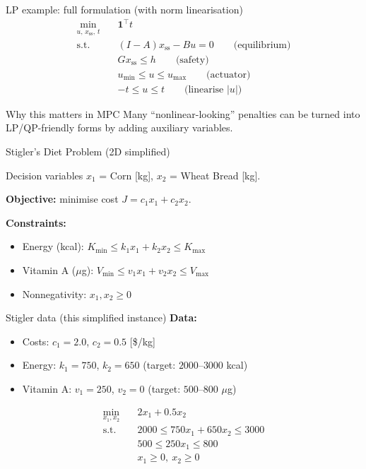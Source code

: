 \documentclass[aspectratio=169,10pt]{beamer}
\begin{document}
\begin{frame}{LP example: full formulation (with norm linearisation)}
\begin{equation*}
\begin{aligned}
\min_{u,\,x_{\mathrm{ss}},\,t}\quad & \mathbf{1}^\top t\\
\text{s.t.}\quad
&(I-A)x_{\mathrm{ss}}-Bu=0 \qquad \text{(equilibrium)}\\
&Gx_{\mathrm{ss}}\le h \qquad \text{(safety)}\\
&u_{\min}\le u\le u_{\max} \qquad \text{(actuator)}\\
&-t\le u\le t \qquad \text{(linearise }|u|\text{)}
\end{aligned}
\end{equation*}

\begin{notebox}{Why this matters in MPC}
Many ``nonlinear-looking'' penalties can be turned into LP/QP-friendly forms by adding auxiliary variables.
\end{notebox}
\end{frame}

\begin{frame}{Stigler's Diet Problem (2D simplified)}
\begin{examplebox}{Decision variables}
$x_1$ = Corn [kg], $x_2$ = Wheat Bread [kg].
\end{examplebox}

\textbf{Objective:} minimise cost $J=c_1x_1+c_2x_2$.

\textbf{Constraints:}
\begin{itemize}
  \item Energy (kcal): $K_{\min}\le k_1x_1+k_2x_2\le K_{\max}$
  \item Vitamin A ($\mu$g): $V_{\min}\le v_1x_1+v_2x_2\le V_{\max}$
  \item Nonnegativity: $x_1,x_2\ge 0$
\end{itemize}
\end{frame}

\begin{frame}{Stigler data (this simplified instance)}
\textbf{Data:}
\begin{itemize}
  \item Costs: $c_1=2.0$, $c_2=0.5$ [\$/kg]
  \item Energy: $k_1=750$, $k_2=650$ (target: $2000$--$3000$ kcal)
  \item Vitamin A: $v_1=250$, $v_2=0$ (target: $500$--$800$ $\mu$g)
\end{itemize}

\begin{equation*}
\begin{aligned}
\min_{x_1,x_2}\quad & 2x_1+0.5x_2\\
\text{s.t.}\quad &2000\le 750x_1+650x_2\le 3000\\
&500\le 250x_1\le 800\\
&x_1\ge 0,\ x_2\ge 0
\end{aligned}
\end{equation*}
\end{frame}
\end{document}

